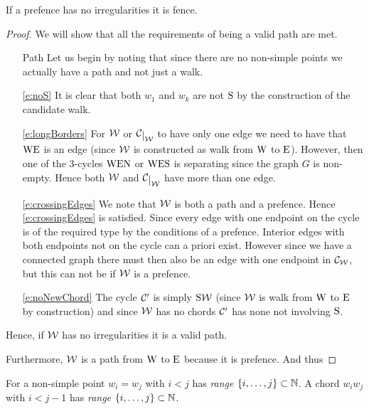 \begin{lemma}
If a prefence has no irregularities it is fence.
\end{lemma}
\begin{proof} 
We will show that all the requirements of being a valid path are met.
 \begin{itemize}
\item [Path] Let us begin by noting that since there are no non-simple points we actually have a path and not just a walk.

\item[\ref{e:noS}] It is clear that both $w_1$ and $w_k$ are not $\mathrm{S}$ by the construction of the candidate walk.

\item[\ref{e:longBorders}] For $\mathcal{W}$ or $\restC \W$ to have only one edge we need to have that $\mathrm{W} \mathrm{E}$ is an edge (since $\mathcal{W}$ is constructed as walk from $\mathrm{W}$ to $\mathrm{E}$). However, then one of the $3$-cycles $\mathrm{W} \mathrm{E} \mathrm{N}$ or $\mathrm{W} \mathrm{E} \mathrm{S}$ is separating since the graph $G$ is non-empty. Hence both $\mathcal{W}$ and $\restC \W$ have more than one edge.

\item[\ref{e:crossingEdges}]
We note that $\mathcal{W}$ is both a path and a prefence. Hence \ref{e:crossingEdges} is satisfied. Since every edge with one endpoint on the cycle is of the required type by the conditions of a prefence. Interior edges with both endpoints not on the cycle can a priori exist. However since we have a connected graph there must then also be an edge with  one endpoint in $\mathcal{C}_{\mathcal{W}}$, but this can not be if $\mathcal{W}$ is a prefence.

\item[\ref{e:noNewChord}] The cycle $\mathcal{C}'$ is simply $\mathrm{S} \mathcal{W}$ (since $\mathcal{W}$ is  walk from $\mathrm{W}$ to $\mathrm{E}$ by construction) and since $\mathcal{W}$ has no chords $\mathcal{C}'$ has none not involving $\mathrm{S}$.
\end{itemize}
Hence, if $\mathcal{W}$ has no irregularities it is a valid path.

Furthermore, $\mathcal{W}$ is a path from $\mathrm{W}$ to $\mathrm{E}$ because it is prefence. And thus
\end{proof}



\begin{defi}
For a non-simple point  $w_i = w_j$ with $i<j$ has \emph{range} $\left\lbrace {i, \ldots, j} \right\rbrace \subset \mathbb{N}$.
A chord $w_i w_j$ with $i< j-1$ has \emph{range} $\left\lbrace {i, \ldots, j} \right\rbrace \subset \mathbb{N}$.
\end{defi}

